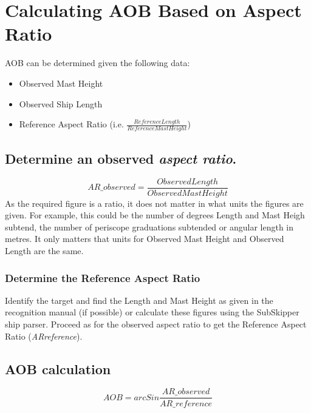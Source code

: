 \documentclass{article}
\begin{document}



\section{Calculating AOB Based on Aspect Ratio}


AOB can be determined given the following data:
\begin{itemize}
\item{Observed Mast Height}
\item{Observed Ship Length}
\item{Reference Aspect Ratio (i.e. $\frac{Reference Length}{Reference Mast Height}$)}
\end{itemize}

\subsection{Determine an observed \emph{aspect ratio}.}
$$AR\_{observed} = \frac{Observed Length}{Observed Mast Height}$$
As the required figure is a ratio, it does not matter in what units the figures are given. For example, this could be the number of degrees Length and Mast Heigh subtend, the number of periscope graduations subtended or angular length in metres. It only matters that units for Observed Mast Height and Observed Length are the same.

\subsubsection{Determine the Reference Aspect Ratio}
Identify the target and find the Length and Mast Height as given in the recognition manual (if possible) or calculate these figures using the SubSkipper ship parser. Proceed as for the observed aspect ratio to get the Reference Aspect Ratio (\emph{ARreference}).

\subsection{AOB calculation}
$$AOB = arcSin \frac{AR\_{observed}}{AR\_{reference}}$$
\end{document}
